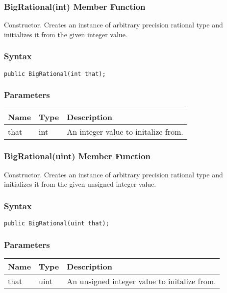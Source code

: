 \documentclass[a4paper,oneside,11.000000pt]{book}
\begin{document}
\hypertarget{System.Numerics.Multiprecision.BigRational.constructor.P.System.Numerics.Multiprecision.BigRational.int}{\subsubsection*{BigRational(int) Member Function}}
\begin{flushleft}
Constructor. Creates an instance of arbitrary precision rational type and initializes it from the given integer value.

\end{flushleft}
\subsubsection*{Syntax}\texttt{public BigRational(int that);}

\subsubsection*{Parameters}
\begin{flushleft}
\begin{supertabular}[l]{lll}
\textbf{Name}
& \textbf{Type}
& \textbf{Description}
\\
\hline
that
& int
& An integer value to initalize from.

\\
\end{supertabular}

\end{flushleft}
\clearpage

\hypertarget{System.Numerics.Multiprecision.BigRational.constructor.P.System.Numerics.Multiprecision.BigRational.uint}{\subsubsection*{BigRational(uint) Member Function}}
\begin{flushleft}
Constructor. Creates an instance of arbitrary precision rational type and initializes it from the given unsigned integer value.

\end{flushleft}
\subsubsection*{Syntax}\texttt{public BigRational(uint that);}

\subsubsection*{Parameters}
\begin{flushleft}
\begin{supertabular}[l]{lll}
\textbf{Name}
& \textbf{Type}
& \textbf{Description}
\\
\hline
that
& uint
& An unsigned integer value to initalize from.

\\
\end{supertabular}

\end{flushleft}
\clearpage
\end{document}
